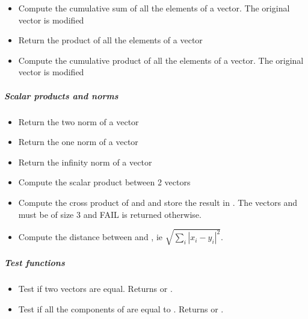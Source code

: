 \begin{itemize}
\item {}
  \sshortdescribe Compute the cumulative sum of all the elements of a
  vector. The original vector is modified

\item {}
  \sshortdescribe Return the product of all the elements of a vector  

\item {}
  \sshortdescribe Compute the cumulative product of all the elements of a
  vector. The original vector is modified
\end{itemize}

\subparagraph{Scalar products and norms}
\begin{itemize}
\item {}
  \sshortdescribe Return the two norm of a vector  

\item {}
  \sshortdescribe Return the one norm of a vector  

\item {}
  \sshortdescribe Return the infinity norm of a vector  

\item {} 
  \sshortdescribe Compute the scalar product between 2 vectors  
\item {}
  \sshortdescribe Compute the cross product of  and  and store the
  result in . The vectors  and  must be of size 3 and
  FAIL is returned otherwise.

\item {}
  \sshortdescribe Compute the distance between  and , ie
  $\sqrt{\sum_i |x_i - y_i|^2}$.

\end{itemize}

\subparagraph{Test functions}

\begin{itemize}
\item {}
  \sshortdescribe Test if two vectors are equal. Returns  or
  .
\item {}
  \sshortdescribe Test if all the components of  are equal to
  . Returns  or .
\end{itemize}

